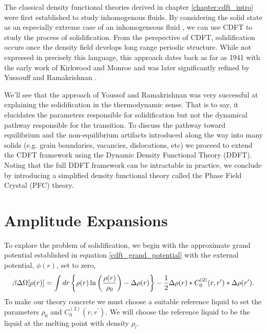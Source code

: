 \label{chapter:cdft_of_freezing}

The classical density functional theories derived in chapter
\ref{chapter:cdft_intro} were first established to study inhomogenous fluids.
By considering the solid state as an especially extreme case of an
inhomogeneous fluid \cite{HANSEN-CH6}, we can use CDFT to study the process of
solidification. From the perspective of CDFT, solidification occurs once the
density field develops long range periodic structure.  While not expressed in
precisely this language, this approach dates back as far as 1941 with the early
work of Kirkwood and Monroe \cite{KIRKWOOD_MONROE41} and was later
significantly refined by Yussouff and Ramakrishnan \cite{RAMAKRISHNAN79}.

We'll see that the approach of Youssof and Ramakrishnan was very successful at
explaining the solidification in the thermodynamic sense. That is to say, it
elucidates the parameters responsible for solidification but not the dynamical
pathway responsible for the transition. To discuss the pathway toward
equilibrium and the non-equilibrium artifacts introduced along the way into
many solids (e.g. grain boundaries, vacancies, dislocations, etc) we proceed to
extend the CDFT framework using the Dynamic Density Functional Theory (DDFT).
Noting that the full DDFT framework can be intractable in practice, we conclude
by introducing a simplified density functional theory called the Phase Field
Crystal (PFC) theory.

\section{Amplitude Expansions} %

To explore the problem of solidification, we begin with the approximate grand
potential established in equation \ref{cdft_grand_potential} with the external
potential, $\phi(r)$, set to zero,
%
\begin{equation}
    \beta \Delta \Omega[\rho(r)] =
        \int dr \left\lbrace 
            \rho(r)\ln\left(\frac{\rho(r)}{\rho_0}\right) - \Delta\rho(r)\right\rbrace
        - \frac{1}{2} \Delta\rho(r) \ast C^{(2)}_0(r, r^\prime)
            \ast \Delta\rho(r^\prime).
\end{equation}
%
To make our theory concrete we must choose a suitable reference liquid to set
the parameters $\rho_0$ and $C^{(2)}_0(r, r^\prime)$. We will choose the
reference liquid to be the liquid at the melting point with density $\rho_l$.

